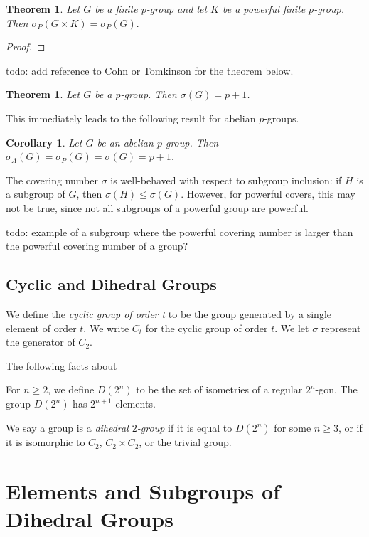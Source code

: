 \documentclass{amsart}
\numberwithin{equation} {section}
\newtheorem{theorem}[equation]{Theorem}
\newtheorem{corollary}[equation]{Corollary}
\theoremstyle{definition}
\begin{document}
\begin{theorem}
Let $G$ be a finite $p$-group and let $K$ be a powerful finite $p$-group. Then $\sigma_P(G \times K) = \sigma_P(G).$
\end{theorem}

\begin{proof}

\end{proof}

todo: add reference to Cohn or Tomkinson for the theorem below. 

\begin{theorem}\label{t:covering-number-doesnt-change-abelian} Let $G$ be a $p$-group. Then $\sigma(G) =  p + 1$.
\end{theorem}

This immediately leads to the following result for abelian $p$-groups. 

\begin{corollary}
Let $G$ be an abelian $p$-group. Then $\sigma_{A}(G) = \sigma_P(G) = \sigma(G) = p+1$.
\end{corollary}

The covering number $\sigma$ is well-behaved with respect to subgroup inclusion: if $H$ is a subgroup of $G$, then $\sigma(H) \leq \sigma(G)$. However, for powerful covers, this may not be true, since not all subgroups of a powerful group are powerful. 

todo: example of a subgroup where the powerful covering number is larger than the powerful covering number of a group? 

\subsection{Cyclic and Dihedral Groups}

We define the \textit{cyclic group of order t} to be the group generated by a single element of order $t$. We write $C_t$ for the cyclic group of order $t$. We let $\sigma$ represent the generator of $C_2$. 

The following facts about 

For $n \geq 2$, we define $D(2^n)$ to be the set of isometries of a regular $2^n$-gon. The group $D(2^n)$ has $2^{n+1}$ elements. 

We say a group is a  \textit{dihedral $2$-group} if it is equal to $D(2^n)$ for some $n \geq 3$, or if it is isomorphic to $C_2$, $C_2 \times C_2$, or the trivial group. 


\section{Elements and Subgroups of Dihedral Groups}
\end{document}
